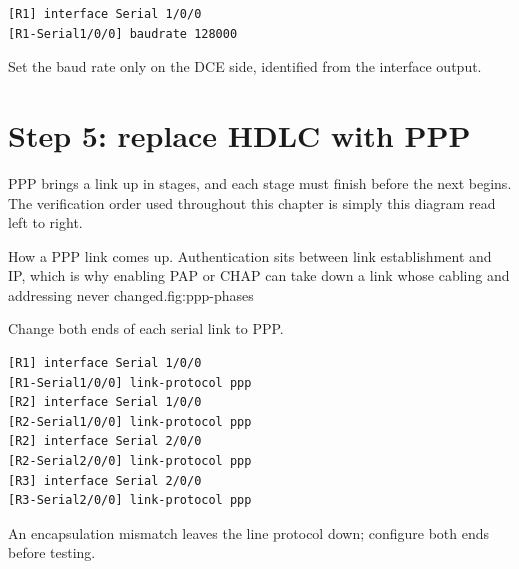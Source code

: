 \begin{lstlisting}[style=utpterminal]
[R1] interface Serial 1/0/0
[R1-Serial1/0/0] baudrate 128000
\end{lstlisting}

\begin{keyidea}
Set the baud rate only on the DCE side, identified from the interface output.
\end{keyidea}

\section{Step 5: replace HDLC with PPP}

PPP brings a link up in stages, and each stage must finish before the
next begins. The verification order used throughout this chapter is
simply this diagram read left to right.

\begin{utpfig}{How a PPP link comes up. Authentication sits between
link establishment and IP, which is why enabling PAP or CHAP can take down a
link whose cabling and addressing never changed.}{fig:ppp-phases}
\end{utpfig}

Change both ends of each serial link to PPP.
\begin{lstlisting}[style=utpterminal]
[R1] interface Serial 1/0/0
[R1-Serial1/0/0] link-protocol ppp
[R2] interface Serial 1/0/0
[R2-Serial1/0/0] link-protocol ppp
[R2] interface Serial 2/0/0
[R2-Serial2/0/0] link-protocol ppp
[R3] interface Serial 2/0/0
[R3-Serial2/0/0] link-protocol ppp
\end{lstlisting}
An encapsulation mismatch leaves the line protocol down; configure both ends before testing.

